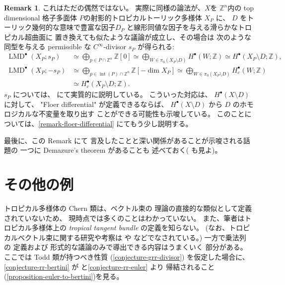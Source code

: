 \documentclass[a4paper,dvipdfmx,reqno,12pt]{amsart}
\theoremstyle{definition}
\newtheorem{remark}[theorem]{Remark}
\newcommand{\opn}[1]{\operatorname{#1}}
\numberwithin{equation}{section}
\begin{document}
\begin{remark}
これはただの偶然ではない。
実際に同様の論法が、$X$を
$\mathbb{Z}^{n}$内の top dimensional 格子多面体
$P$の射影的トロピカルトーリック多様体 $X_P$ に、
$D$ をトーリック幾何的な意味で豊富な因子$D_P$
と線形同値な因子を与える滑らかなトロピカル超曲面に
置き換えても似たような議論が成立し、その場合は
次のような同型を与える permissible な 
$C^{\infty}$-divisor 
$s_{P}$ が得られる:
\begin{align}
\opn{LMD}^{\bullet}(X_P;s_{P})
&\simeq \bigoplus_{p\in P\cap \mathbb{Z}^{n}}\mathbb{Z}[0]
\simeq \bigoplus_{W\in \pi_0(X_P\setminus D)}
H^{\bullet}(W;\mathbb{Z})\simeq 
H^{\bullet}(X_P\setminus D;\mathbb{Z}), \\
\opn{LMD}^{\bullet}(X_P;-s_{P})
&\simeq \bigoplus_{p\in \opn{int}(P)\cap \mathbb{Z}^{n}}
\mathbb{Z}[-\dim X_P]
\simeq \bigoplus_{W\in \pi_0(X_P\setminus D)}
H^{\bullet}_c(W;\mathbb{Z}) \\
&\simeq H^{\bullet}_c(X_P\setminus D;\mathbb{Z}).
\end{align}
$s_P$ については、\cite[Appendix D]{tsutsui2023graded}
にて実質的に説明している。
こういった対応は、
$H^{\bullet}(X\setminus D)$ に対して、
"Floer differential" が定義できるならば、
$H^{\bullet}(X\setminus D)$ から
$D$ のホモロジカルな不変量を取り出す
ことができる可能性も示唆している。
このことについては、\cref{remark-floer-differential}
にてもう少し説明する。

最後に、この Remark にて
言及したことと深い関係があることが示唆される話題の
一つに
Demazure's theorem \cite{MR284446} があることも
述べておく(\cite[]{MR2810322} も見よ)。
\end{remark}

\section{その他の例}
\cite{demedrano2023chern}
トロピカル多様体の Chern 類は、ベクトル束の
理論の直接的な類似として定義されていないため、
現時点では多くのことはわかっていない。
また、筆者はトロピカル多様体上の
\emph{tropical tangent bundle} の定義を知らない。
(なお、トロピカルベクトル束に関する研究や考察は
\cite{MR2961320,MR4646329}
や \cite[Theorem 1.8]{amini2020hodge}
などでなされている。)
一方で乗法列 \cite[]{MR1335917} の
定義および
形式的な議論のみで導出できる内容はうまくいく
部分がある。
ここでは Todd 類が持つべき性質
(\cref{conjecture-grr-divisor})
を仮定した場合に、
\cref{conjecture-rr-bertini} 
が\cite[Conjecture 6.13]{demedrano2023chern}
と\cref{conjecture-rr-euler} より
帰結されること
(\cref{proposition-euler-to-bertini})を見る。
\end{document}
